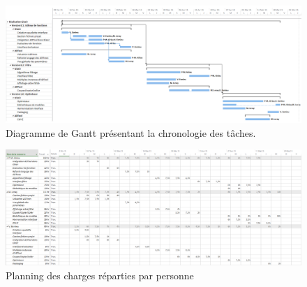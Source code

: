         \begin{landscape}
            \begin{figure}
                \centering
                \includegraphics[height=0.66\textwidth]{figure/DiagGantt.png}
                \caption{Diagramme de Gantt présentant la chronologie des tâches.}
                \label{fig:gantt}
            \end{figure}
        \end{landscape}

        \begin{landscape}
            \begin{figure}
                \centering
                \includegraphics[height=0.66\textwidth]{figure/RepartitionTaches2.png}
                \caption{Planning des charges réparties par personne}
                \label{fig:planning_charge}
            \end{figure}
        \end{landscape}

